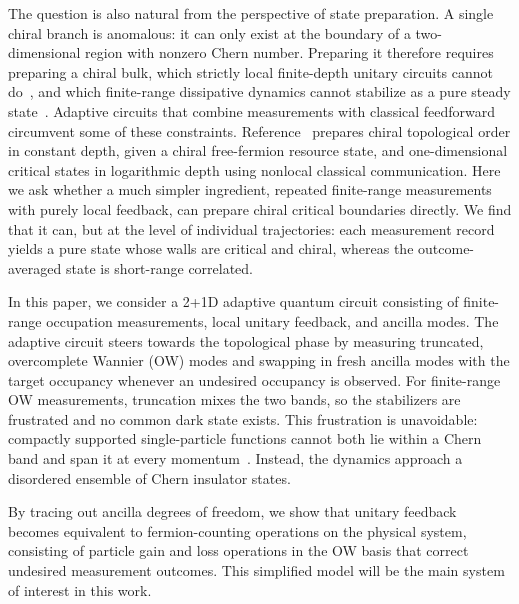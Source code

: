 \documentclass[aps,prb,10pt,twocolumn,superscriptaddress,longbibliography,floatfix]{revtex4-2}
\newcommand{\claudeadd}[1]{{\color{orange}#1}}
\begin{document}
\claudeadd{The question is also natural from the perspective of state preparation. A single chiral branch is anomalous: it can only exist at the boundary of a two-dimensional region with nonzero Chern number. Preparing it therefore requires preparing a chiral bulk, which strictly local finite-depth unitary circuits cannot do~\cite{LuLessaKimHsieh2022}, and which finite-range dissipative dynamics cannot stabilize as a pure steady state~\cite{BardynEtAl2013,BudichZollerDiehl2015,Goldstein2019}. Adaptive circuits that combine measurements with classical feedforward circumvent some of these constraints. Reference~\cite{LuLessaKimHsieh2022} prepares chiral topological order in constant depth, given a chiral free-fermion resource state, and one-dimensional critical states in logarithmic depth using nonlocal classical communication. Here we ask whether a much simpler ingredient, repeated finite-range measurements with purely local feedback, can prepare chiral critical boundaries directly. We find that it can, but at the level of individual trajectories: each measurement record yields a pure state whose walls are critical and chiral, whereas the outcome-averaged state is short-range correlated.}


In this paper, we consider a 2+1D adaptive quantum circuit consisting of finite-range occupation measurements, local unitary feedback, and ancilla modes. The adaptive circuit steers towards the topological phase by measuring truncated, overcomplete Wannier (OW) modes and swapping in fresh ancilla modes with the target occupancy whenever an undesired occupancy is observed. \claudeadd{For finite-range OW measurements, truncation mixes the two bands, so the stabilizers are frustrated and no common dark state exists. This frustration is unavoidable: compactly supported single-particle functions cannot both lie within a Chern band and span it at every momentum~\cite{DubailRead2015}.} Instead, the dynamics approach a disordered ensemble of Chern insulator states.

 
By tracing out ancilla degrees of freedom, we show that unitary feedback becomes equivalent to fermion-counting operations on the physical system, consisting of particle gain and loss operations in the OW basis that correct undesired measurement outcomes. This simplified model will be the main system of interest in this work.
\end{document}
